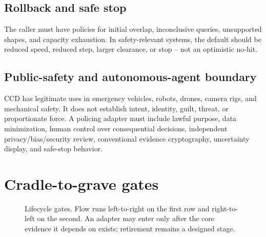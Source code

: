 \documentclass[11pt,a4paper,openany]{book}
\begin{document}
\section{Rollback and safe stop}
The caller must have policies for initial overlap, inconclusive queries, unsupported shapes, and capacity exhaustion. In safety-relevant systems, the default should be reduced speed, reduced step, larger clearance, or stop -- not an optimistic no-hit.

\section{Public-safety and autonomous-agent boundary}
CCD has legitimate uses in emergency vehicles, robots, drones, camera rigs, and mechanical safety. It does not establish intent, identity, guilt, threat, or proportionate force. A policing adapter must include lawful purpose, data minimization, human control over consequential decisions, independent privacy/bias/security review, conventional evidence cryptography, uncertainty display, and safe-stop behavior.

\chapter{Cradle-to-grave gates}
\begin{figure}[H]
\centering
{}
\caption{Lifecycle gates. Flow runs left-to-right on the first row and right-to-left on the second. An adapter may enter only after the core evidence it depends on exists; retirement remains a designed stage.}
\label{fig:lifecycle}
\end{figure}
\end{document}
